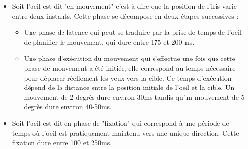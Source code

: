 \documentclass[a4paper, 12pt]{report}
\begin{document}
\begin{itemize}
\item Soit l'oeil est dit "en mouvement" c'est à dire que la position de l'iris varie entre deux instants. Cette phase se décompose en deux étapes successives :
\begin{itemize}
\item Une phase de latence qui peut se traduire par la prise de temps de l'oeil de planifier le mouvement, qui dure entre 175 et 200 ms.
\item Une phase d'exécution du mouvement qui s'effectue une fois que cette phase de mouvement a été initiée, elle correspond au temps nécessaire pour déplacer réellement les yeux vers la cible. Ce temps d'exécution dépend de la distance entre la position initiale de l'oeil et la cible. Un mouvement de 2 degrès dure environ 30ms tandis qu'un mouvement de 5 degrès dure environ 40-50ms.
\end{itemize}
\item Soit l'oeil est dit en phase de "fixation" qui correspond à une période de temps où l'oeil est pratiquement maintenu vers une unique direction. Cette fixation dure entre 100 et 250ms. 
\end{itemize}
 
\end{document}
